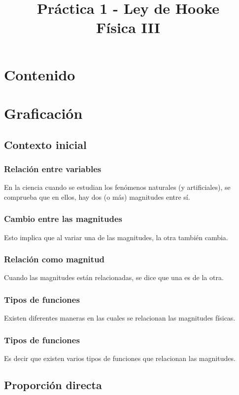 \documentclass[14pt]{beamer}
\title{\Large{Práctica 1 - Ley de Hooke} \\ \normalsize{Física III}}
\date{}
\begin{document}
\maketitle

\section*{Contenido}

\section{Graficación}
\subsection{Contexto inicial}

\begin{frame}
\frametitle{Relación entre variables}
En la ciencia cuando se estudian los fenómenos naturales (y artificiales), se comprueba que en ellos, hay dos (o más) magnitudes  entre sí.
\end{frame}
\begin{frame}
\frametitle{Cambio entre las magnitudes}
Esto implica que al variar una de las magnitudes, la otra también cambia.
\end{frame}
\begin{frame}
\frametitle{Relación como magnitud}
Cuando las magnitudes están relacionadas, se dice que una es  de la otra.
\end{frame}
\begin{frame}
\frametitle{Tipos de funciones}
Existen diferentes maneras en las cuales se relacionan las magnitudes físicas.
\end{frame}
\begin{frame}
\frametitle{Tipos de funciones}
Es decir que existen varios tipos de funciones que relacionan las magnitudes.
\end{frame}

\subsection{Proporción directa}
\end{document}
